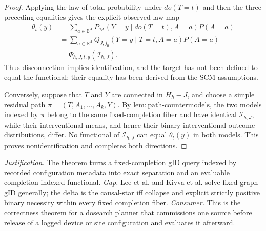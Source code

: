 \documentclass{article}
\begin{document}
\begin{proof}
Applying the law of total probability under \(do(T=t)\) and then the three preceding equalities gives the explicit observed-law map
\[
 \begin{aligned}
 \theta_t(y)
 &=\sum_{a\in\mathbb B^A}
 P_{\mathcal M}(Y=y\mid do(T=t),A=a)P(A=a)\\
 &=\sum_{a\in\mathbb B^A}
 Q_{J,j_0}(Y=y\mid T=t,A=a)P(A=a)\\
 &=\Psi_{h,J,t,y}(\mathcal I_{h,J}).
 \end{aligned}
\]
Thus disconnection implies identification, and the target has not been defined to equal the functional: their equality has been derived from the SCM assumptions.

Conversely, suppose that \(T\) and \(Y\) are connected in \(H_h-J\), and choose a simple residual path \(\pi=(T,A_1,\ldots,A_k,Y)\).  By \(\mathrm{lem{:}path\text{-}countermodels}\), the two models indexed by \(\pi\) belong to the same fixed-completion fiber and have identical \(\mathcal I_{h,J}\), while their interventional means, and hence their binary interventional outcome distributions, differ.  No functional of \(\mathcal I_{h,J}\) can equal \(\theta_t(y)\) in both models.  This proves nonidentification and completes both directions.
\end{proof}
\par\smallskip\noindent \textit{Justification.} The theorem turns a fixed-completion gID query indexed by recorded configuration metadata into exact separation and an evaluable completion-indexed functional. \textit{Gap.} Lee et al. and Kivva et al. solve fixed-graph gID generally; the delta is the causal-star iff collapse and explicit strictly positive binary necessity within every fixed completion fiber. \textit{Consumer.} This is the correctness theorem for a dosearch planner that commissions one source before release of a logged device or site configuration and evaluates it afterward.
\end{document}
